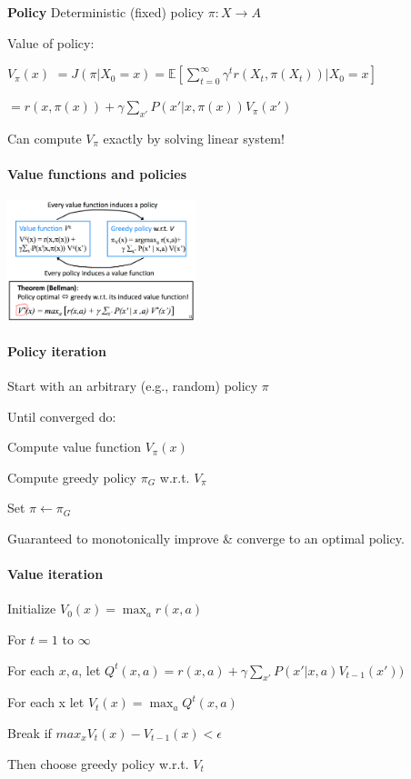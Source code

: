 \documentclass[a4paper, 11pt]{scrartcl}
\begin{document}
\begin{multicols*}{3}
\textbf{Policy}
Deterministic (fixed) policy $\pi: X \rightarrow A$

Value of policy: 

$V_\pi(x)$ $= J(\pi | X_0 = x) $$= \mathds{E}[\sum_{t=0}^{\infty} \gamma^t r(X_t, \pi(X_t)) | X_0 = x] $

$= r(x, \pi(x)) + \gamma \sum_{x'} P(x' | x, \pi(x)) V_\pi(x')$

Can compute $V_\pi$ exactly by solving linear system! 

\paragraph{Value functions and policies}

\includegraphics[height=3.5cm]{img/pai5.png}

\paragraph{Policy iteration}
\begin{compactitem}
	\item Start with an arbitrary (e.g., random) policy $\pi$
	\item Until converged do:
	\item Compute value function $V_\pi(x)$
	\item Compute greedy policy $\pi_G$ w.r.t. $V_\pi$
	\item Set $\pi \leftarrow \pi_G$
\end{compactitem}

Guaranteed to monotonically improve \& converge to an optimal policy.

\paragraph{Value iteration}
\begin{compactitem}
\item Initialize $V_0(x) = \max_a r(x, a)$
\item For $t=1$ to $\infty$ 
\item For each $x, a$, let $Q^t(x,a) = r(x, a) + \gamma \sum_{x'} P(x' | x, a) V_{t-1}(x'))$
\item For each x let $V_t(x) = \max_a Q^t(x,a)$
\item Break if $max_x V_t(x) - V_{t-1}(x) < \epsilon$
\item Then choose greedy policy w.r.t. $V_t$
\end{compactitem}


\end{multicols*}
\end{document}
